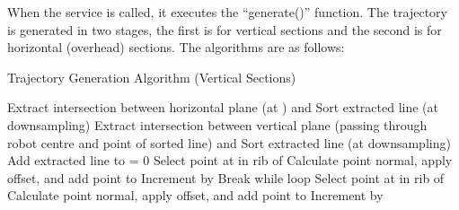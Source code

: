 When the service is called, it executes the ``generate()'' function. The trajectory is generated in two stages, the first is for vertical sections and the second is for horizontal (overhead) sections. The algorithms are as follows:
\begin{algorithm}[H]
\caption{Trajectory Generation Algorithm (Vertical Sections)}
\label{alg:trajv}
\begin{algorithmic}[1]
\begin{raggedright}
\State Extract intersection between horizontal plane (at ) and 
\State Sort extracted line (at  downsampling)
\State Extract intersection between vertical plane (passing through robot centre and  point of sorted line) and 
\State Sort extracted line (at  downsampling)
\State Add extracted line to 
\EndFor
\State {} = 0
\State Select point at  in rib  of 
\State Calculate point normal, apply offset, and add point to 
\EndFor
\State Increment  by 
\State Break while loop
\EndIf
{}
\State Select point at  in rib  of 
\State Calculate point normal, apply offset, and add point to 
\EndFor
\State Increment  by 
\EndWhile
\EndFunction\\
\Return {}
\end{raggedright}
\end{algorithmic}
\end{algorithm}
